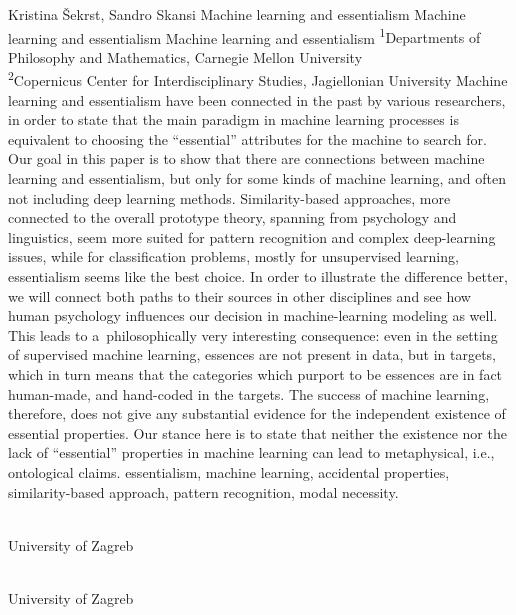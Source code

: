 \begin{artengenv2auth}{Kristina Šekrst, Sandro Skansi}
	{Machine learning and essentialism}
	{Machine learning and essentialism}
	{Machine learning and essentialism}
	{\textsuperscript{1}Departments of Philosophy and Mathematics, Carnegie Mellon University\\
		\textsuperscript{2}Copernicus Center for Interdisciplinary Studies, Jagiellonian University}
	{Machine learning and essentialism have been connected in the past by various researchers, in order to state that the main paradigm in machine learning processes is equivalent to choosing the ``essential'' attributes for the machine to search for. Our goal in this paper is to show that there are connections between machine learning and essentialism, but only for some kinds of machine learning, and often not including deep learning methods. Similarity-based approaches, more connected to the overall prototype theory, spanning from psychology and linguistics, seem more suited for pattern recognition and complex deep-learning issues, while for classification problems, mostly for unsupervised learning, essentialism seems like the best choice. In order to illustrate the difference better, we will connect both paths to their sources in other disciplines and see how human psychology influences our decision in machine-learning modeling as well. This leads to a~philosophically very interesting consequence: even in the setting of supervised machine learning, essences are not present in data, but in targets, which in turn means that the categories which purport to be essences are in fact human-made, and hand-coded in the targets. The success of machine learning, therefore, does not give any substantial evidence for the independent existence of essential properties. Our stance here is to state that neither the existence nor the lack of ``essential'' properties in machine learning can lead to metaphysical, i.e., ontological claims.}
	{essentialism, machine learning, accidental properties, similarity-based approach, pattern recognition, modal necessity.}
	{%
		{\flushright{}\\\subsubsectit\small{University of Zagreb}\par}%
		{\flushright{}\\\subsubsectit\small{University of Zagreb}\par}%
	}



\end{artengenv2auth}
